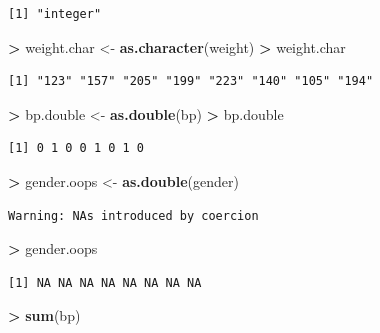 \documentclass[]{krantz}
\makeatletter
\newenvironment{Shaded}{\begin{snugshade}}{\end{snugshade}}
\newcommand{\KeywordTok}[1]{\textcolor[rgb]{0.27,0.27,0.27}{\textbf{#1}}}
\newcommand{\StringTok}[1]{\textcolor[rgb]{0.5,0.5,0.5}{#1}}
\newcommand{\OperatorTok}[1]{\textcolor[rgb]{0.43,0.43,0.43}{\textbf{#1}}}
\newcommand{\NormalTok}[1]{#1}
\newenvironment{kframe}{%
\medskip{}
\setlength{\fboxsep}{.8em}
 \def\at@end@of@kframe{}%
 \ifinner\ifhmode%
  \def\at@end@of@kframe{\end{minipage}}%
  \begin{minipage}{\columnwidth}%
 \fi\fi%
 \def\FrameCommand##1{\hskip\@totalleftmargin \hskip-\fboxsep
 \colorbox{shadecolor}{##1}\hskip-\fboxsep
     \hskip-\linewidth \hskip-\@totalleftmargin \hskip\columnwidth}%
 \MakeFramed {\advance\hsize-\width
   \@totalleftmargin\z@ \linewidth\hsize
   \@setminipage}}%
 {\par\unskip\endMakeFramed%
 \at@end@of@kframe}
\renewenvironment{Shaded}{\begin{kframe}}{\end{kframe}}
\makeatother
\begin{document}
\begin{verbatim}
[1] "integer"
\end{verbatim}

\begin{Shaded}
\begin{Highlighting}[]
\OperatorTok{>}\StringTok{ }\NormalTok{weight.char <-}\StringTok{ }\KeywordTok{as.character}\NormalTok{(weight)}
\OperatorTok{>}\StringTok{ }\NormalTok{weight.char}
\end{Highlighting}
\end{Shaded}

\begin{verbatim}
[1] "123" "157" "205" "199" "223" "140" "105" "194"
\end{verbatim}

\begin{Shaded}
\begin{Highlighting}[]
\OperatorTok{>}\StringTok{ }\NormalTok{bp.double <-}\StringTok{ }\KeywordTok{as.double}\NormalTok{(bp)}
\OperatorTok{>}\StringTok{ }\NormalTok{bp.double}
\end{Highlighting}
\end{Shaded}

\begin{verbatim}
[1] 0 1 0 0 1 0 1 0
\end{verbatim}

\begin{Shaded}
\begin{Highlighting}[]
\OperatorTok{>}\StringTok{ }\NormalTok{gender.oops <-}\StringTok{ }\KeywordTok{as.double}\NormalTok{(gender)}
\end{Highlighting}
\end{Shaded}

\begin{verbatim}
Warning: NAs introduced by coercion
\end{verbatim}

\begin{Shaded}
\begin{Highlighting}[]
\OperatorTok{>}\StringTok{ }\NormalTok{gender.oops}
\end{Highlighting}
\end{Shaded}

\begin{verbatim}
[1] NA NA NA NA NA NA NA NA
\end{verbatim}

\begin{Shaded}
\begin{Highlighting}[]
\OperatorTok{>}\StringTok{ }\KeywordTok{sum}\NormalTok{(bp)}
\end{Highlighting}
\end{Shaded}
\end{document}
